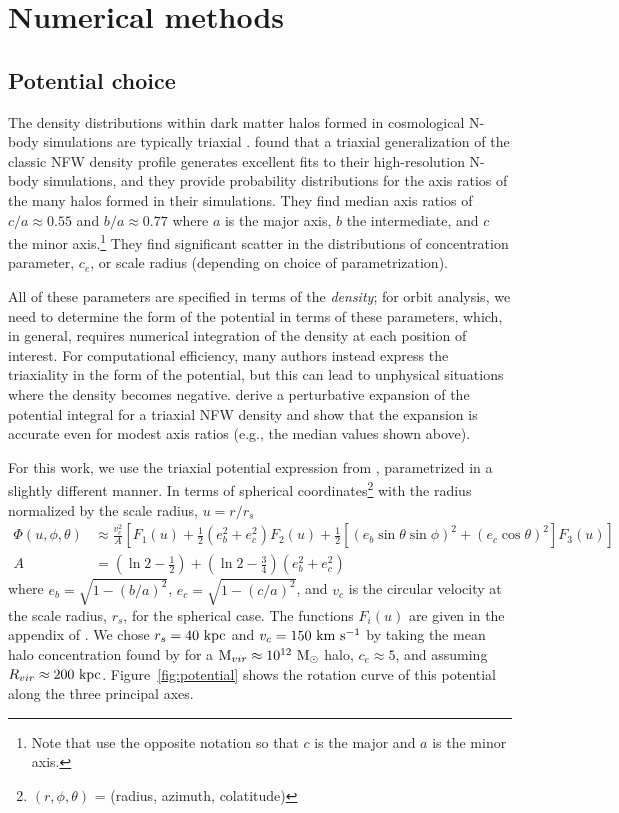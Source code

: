 \documentclass[letterpaper,12pt,preprint]{aastex}
\newcommand{\msun}{\mathrm{M}_\odot}
\begin{document}
\section{Numerical methods}\label{sec:methods}

\subsection{Potential choice}\label{sec:potential}

The density distributions within dark matter halos formed in cosmological N-body simulations are typically triaxial \citep[e.g.,][]{jing02, bett07, zemp09, veraciro11}. \citet{jing02} found that a triaxial generalization of the classic NFW density profile \citep{navarro96} generates excellent fits to their high-resolution N-body simulations, and they provide probability distributions for the axis ratios of the many halos formed in their simulations. They find median axis ratios of $c/a \approx 0.55$ and $b/a \approx 0.77$ where $a$ is the major axis, $b$ the intermediate, and $c$ the minor axis.\footnote{Note that \citet{jing02} use the opposite notation so that $c$ is the major and $a$ is the minor axis.} They find significant scatter in the distributions of concentration parameter, $c_e$, or scale radius (depending on choice of parametrization). 

All of these parameters are specified in terms of the \emph{density}; for orbit analysis, we need to determine the form of the potential in terms of these parameters, which, in general, requires numerical integration of the density at each position of interest. For computational efficiency, many authors instead express the triaxiality in the form of the potential, but this can lead to unphysical situations where the density becomes negative. \citet{leesuto03} derive a perturbative expansion of the potential integral for a triaxial NFW density and show that the expansion is accurate even for modest axis ratios (e.g., the median values shown above). 

For this work, we use the triaxial potential expression from \citet{leesuto03}, parametrized in a slightly different manner. In terms of spherical coordinates\footnote{$(r,\phi,\theta)$ = (radius, azimuth, colatitude)} with the radius normalized by the scale radius, $u = r/r_s$
\begin{align}
	\Phi(u,\phi,\theta) &\approx \frac{v_c^2}{A}\left[F_1(u) + \frac{1}{2}(e_b^2 + e_c^2)F_2(u) + \frac{1}{2} [(e_b\sin\theta \sin\phi)^2 + (e_c\cos\theta)^2] F_3(u) \right]\\
	A &= \left(\ln2 - \frac{1}{2}\right) + \left(\ln2-\frac{3}{4}\right) (e_b^2 + e_c^2)
\end{align}
where $e_b = \sqrt{1 - (b/a)^2}$, $e_c = \sqrt{1 - (c/a)^2}$, and $v_c$ is the circular velocity at the scale radius, $r_s$, for the spherical case. The functions $F_i(u)$ are given in the appendix of \cite{leesuto03}. We chose $r_s=40~{\rm kpc}$ and $v_c = 150~{\rm km}~{\rm s}^{-1}$ by taking the mean halo concentration found by \cite{jing02} for a ${\rm M}_{vir} \approx 10^{12}~\msun$ halo, $c_e\approx5$, and assuming $R_{vir}\approx200~{\rm kpc}$. Figure~\ref{fig:potential} shows the rotation curve of this potential along the three principal axes.
\end{document}
